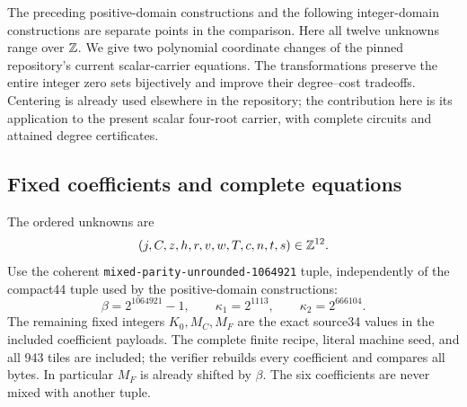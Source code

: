 \label{sec:integer12}

The preceding positive-domain constructions and the following
integer-domain constructions are separate points in the comparison.
Here all twelve unknowns range over $\mathbb Z$.  We give two polynomial
coordinate changes of the pinned repository's current scalar-carrier
equations.  The transformations preserve the entire integer zero sets
bijectively and improve their degree--cost tradeoffs.  Centering is already
used elsewhere in the repository; the contribution here is its application
to the present scalar four-root carrier, with complete circuits and attained
degree certificates.

\subsection{Fixed coefficients and complete equations}

The ordered unknowns are
\[
 (j,C,z,h,r,v,w,T,c,n,t,s)\in\mathbb Z^{12}.
\]
Use the coherent \texttt{mixed-parity-unrounded-1064921} tuple, independently
of the compact44 tuple used by the positive-domain constructions:
\[
 \beta=2^{1064921}-1,\qquad
 \kappa_1=2^{1113},\qquad \kappa_2=2^{666104}.
\]
The remaining fixed integers $K_0,M_C,M_F$ are the exact source34 values
in the included coefficient payloads.  The complete finite recipe,
literal machine seed, and all 943 tiles are included; the verifier rebuilds
every coefficient and compares all bytes.  In particular $M_F$ is already
shifted by $\beta$.  The six coefficients are never mixed with another
tuple.

